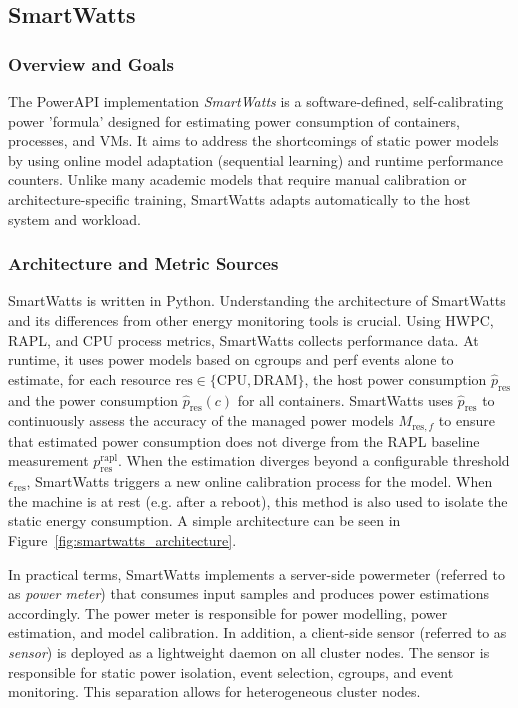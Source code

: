 \subsection{SmartWatts}
\label{sec:smartwatts}
\subsubsection{Overview and Goals}
\label{sec:smartwatts-overview}
The PowerAPI implementation \textit{SmartWatts}\parencite{fieni2020smartwatts} is a software-defined, self-calibrating power 'formula' designed for estimating power consumption of containers, processes, and VMs. It aims to address the shortcomings of static power models by using online model adaptation (sequential learning) and runtime performance counters. Unlike many academic models that require manual calibration or architecture-specific training, SmartWatts adapts automatically to the host system and workload.

\subsubsection{Architecture and Metric Sources}
\label{sec:smartwatts-architecture}
SmartWatts is written in Python. Understanding the architecture of SmartWatts and its differences from other energy monitoring tools is crucial. Using HWPC, RAPL, and CPU process metrics, SmartWatts collects performance data. At runtime, it uses power models based on cgroups and perf events alone to estimate, for each resource $\text{res} \in \{\text{CPU}, \text{DRAM}\}$, the host power consumption $\hat{p}_{\text{res}}$ and the power consumption $\hat{p}_{\text{res}}(c)$ for all containers. SmartWatts uses $\hat{p}_{\text{res}}$ to continuously assess the accuracy of the managed power models $M_{\text{res}, f}$ to ensure that estimated power consumption does not diverge from the RAPL baseline measurement $p_{\text{res}}^{\text{rapl}}$. When the estimation diverges beyond a configurable threshold $\epsilon_{\text{res}}$, SmartWatts triggers a new online calibration process for the model. When the machine is at rest (e.g. after a reboot), this method is also used to isolate the static energy consumption. A simple architecture can be seen in Figure~\ref{fig:smartwatts_architecture}.

In practical terms, SmartWatts implements a server-side powermeter (referred to as \textit{power meter}) that consumes input samples and produces power estimations accordingly. The power meter is responsible for power modelling, power estimation, and model calibration. In addition, a client-side sensor (referred to as \textit{sensor}) is deployed as a lightweight daemon on all cluster nodes. The sensor is responsible for static power isolation, event selection, cgroups, and event monitoring. This separation allows for heterogeneous cluster nodes.

